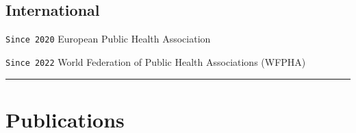 \documentclass[
  12pt,
  letterpaper,
  DIV=11,
  numbers=noendperiod]{scrartcl}
\begin{document}
\subsection{International}\label{international}

\texttt{Since\ 2020} European Public Health Association

\texttt{Since\ 2022} World Federation of Public Health Associations
(WFPHA)

\begin{center}\rule{0.5\linewidth}{0.5pt}\end{center}

\section{Publications}\label{publications}
\end{document}
